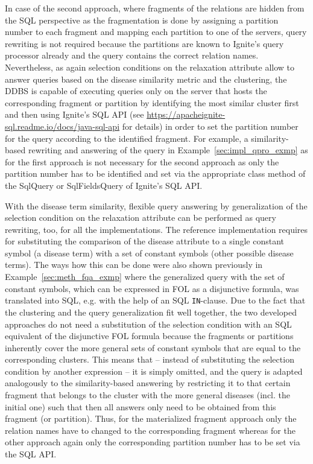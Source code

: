 In case of the second approach, where fragments of the relations are hidden from the SQL perspective as the fragmentation is done by assigning a partition
number to each fragment and mapping each partition to one of the servers, query rewriting is not required because the partitions are known to Ignite's query
processor already and the query contains the correct relation names. Nevertheless, as again selection conditions on the relaxation attribute allow to answer
queries based on the disease similarity metric and the clustering, the DDBS is capable of executing queries only on the server that hosts the corresponding
fragment or partition by identifying the most similar cluster first and then using Ignite's SQL API (see
\url{https://apacheignite-sql.readme.io/docs/java-sql-api} for details) in order to set the partition number for the query according to the identified 
fragment. For example, a similarity-based rewriting and answering of the query in Example~\ref{sec:impl_qpro_exmp} as for the first approach is not necessary
for the second approach as only the partition number has to be identified and set via the appropriate class method of the SqlQuery or SqlFieldsQuery of 
Ignite's SQL API. 


With the disease term similarity, flexible query answering by generalization of the selection condition on the relaxation attribute can be performed
as query rewriting, too, for all the implementations. The reference implementation requires for substituting the comparison of the disease attribute to a 
single constant symbol (a disease term) with a set of constant symbols (other possible disease terms). The ways how this can be done were also shown previously 
in Example~\ref{sec:meth_fqa_exmp} where the generalized query with the set of constant symbols, which can be expressed in FOL as a disjunctive formula, was
translated into SQL, e.g. with the help of an SQL \verb!IN!-clause. Due to the fact that the clustering and the query generalization fit well together, the two
developed approaches do not need a substitution of the selection condition with an SQL equivalent of the disjunctive FOL formula because the fragments or
partitions inherently cover the more general sets of constant symbols that are equal to the corresponding clusters. This means that -- instead of substituting
the selection condition by another expression -- it is simply omitted, and the query is adapted analogously to the similarity-based answering by restricting it 
to that certain fragment that belongs to the cluster with the more general diseases (incl. the initial one) such that then all answers only need to be obtained
from this fragment (or partition). Thus, for the materialized fragment approach only the relation names have to changed to the corresponding fragment whereas
for the other approach again only the corresponding partition number has to be set via the SQL API. 

